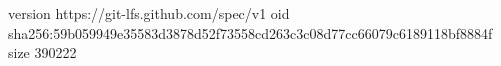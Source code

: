 version https://git-lfs.github.com/spec/v1
oid sha256:59b059949e35583d3878d52f73558cd263c3c08d77cc66079c6189118bf8884f
size 390222
